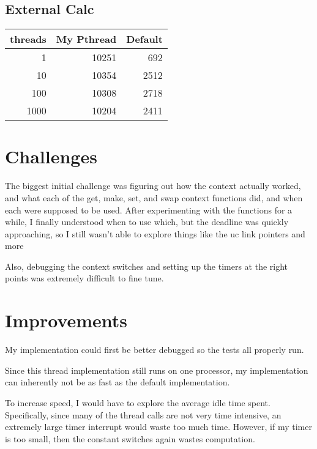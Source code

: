 \documentclass[11pt]{article}
\begin{document}
\subsection*{External Calc}
\label{sec:orgbd4ece4}
\begin{center}
\begin{tabular}{rrr}
threads & My Pthread & Default\\
\hline
1 & 10251 & 692\\
10 & 10354 & 2512\\
100 & 10308 & 2718\\
1000 & 10204 & 2411\\
\end{tabular}
\end{center}

\section*{Challenges}
\label{sec:org8d8c5fc}
The biggest initial challenge was figuring out how the context actually worked, and what each of the get, make, set, and swap context functions did, and when each were supposed to be used.
After experimenting with the functions for a while, I finally understood when to use which, but the deadline was quickly approaching, so I still wasn't able to explore things like the uc link pointers and more

Also, debugging the context switches and setting up the timers at the right points was extremely difficult to fine tune.

\section*{Improvements}
\label{sec:org6c8e74c}
My implementation could first be better debugged so the tests all properly run.

Since this thread implementation still runs on one processor, my implementation can inherently not be as fast as the default implementation.

To increase speed, I would have to explore the average idle time spent. Specifically, since many of the thread calls are not very time intensive, an extremely large timer interrupt would waste too much time. However, if my timer is too small, then the constant switches again wastes computation. 
\end{document}
